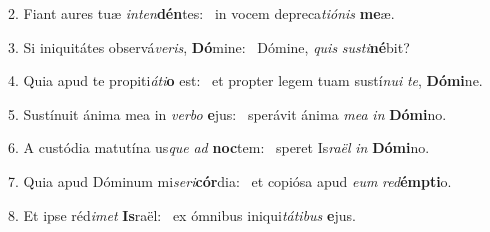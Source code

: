 2. Fiant aures tuæ \textit{in}\textit{ten}\textbf{dén}tes: \ast\  in vocem depreca\textit{ti}\textit{ó}\textit{nis} \textbf{me}æ.\

3. Si iniquitátes observá\textit{ve}\textit{ris}, \textbf{Dó}mine: \ast\  Dómine, \textit{quis} \textit{sus}\textit{ti}\textbf{né}bit?\

4. Quia apud te propiti\textit{á}\textit{ti}\textbf{o} est: \ast\  et propter legem tuam sustí\textit{nu}\textit{i} \textit{te}, \textbf{Dó}\textbf{mi}ne.\

5. Sustínuit ánima mea in \textit{ver}\textit{bo} \textbf{e}jus: \ast\  sperávit ánima \textit{me}\textit{a} \textit{in} \textbf{Dó}\textbf{mi}no.\

6. A custódia matutína us\textit{que} \textit{ad} \textbf{noc}tem: \ast\  speret Is\textit{ra}\textit{ël} \textit{in} \textbf{Dó}\textbf{mi}no.\

7. Quia apud Dóminum mi\textit{se}\textit{ri}\textbf{cór}dia: \ast\  et copiósa apud \textit{e}\textit{um} \textit{red}\textbf{émp}\textbf{ti}o.\

8. Et ipse réd\textit{i}\textit{met} \textbf{Is}raël: \ast\  ex ómnibus iniqui\textit{tá}\textit{ti}\textit{bus} \textbf{e}jus.\

